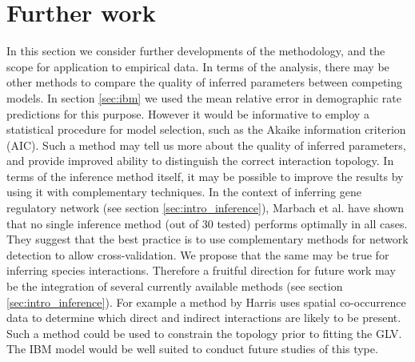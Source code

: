 



\section{Further work}
\label{sec:si_conc}

In this section we consider further developments of the methodology, and the scope for application to empirical data. In terms of the analysis, there may be other methods to compare the quality of inferred parameters between competing models. In section \ref{sec:ibm} we used the mean relative error in demographic rate predictions for this purpose. However it would be informative to employ a statistical procedure for model selection, such as the Akaike information criterion (AIC). Such a method may tell us more about the quality of inferred parameters, and provide improved ability to distinguish the correct interaction topology. In terms of the inference method itself, it may be possible to improve the results by using it with complementary techniques. In the context of inferring gene regulatory network (see section \ref{sec:intro_inference}), Marbach et al. \cite{marbach2012wisdom} have shown that no single inference method (out of 30 tested) performs optimally in all cases. They suggest that the best practice is to use complementary methods for network detection to allow cross-validation. We propose that the same may be true for inferring species interactions. Therefore a fruitful direction for future work may be the integration of several currently available methods (see section \ref{sec:intro_inference}). For example a method by Harris \cite{Harris018861} uses spatial co-occurrence data to determine which direct and indirect interactions are likely to be present. Such a method could be used to constrain the topology prior to fitting the GLV. The IBM model would be well suited to conduct future studies of this type.


